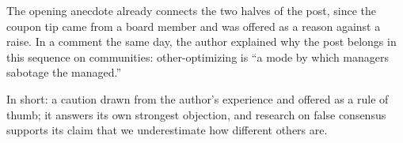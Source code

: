 \begin{afterword}
The opening anecdote already connects the two halves of the post, since the coupon tip came from a board member and was offered as a reason against a raise. In a comment the same day, the author explained why the post belongs in this sequence on communities: other-optimizing is ``a mode by which managers sabotage the managed.''

In short: a caution drawn from the author's experience and offered as a rule of thumb; it answers its own strongest objection, and research on false consensus supports its claim that we underestimate how different others are.
\end{afterword}
